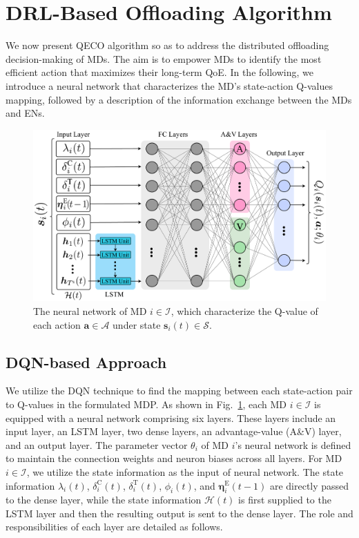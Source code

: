 \documentclass[10pt, journal,letterpaper]{IEEEtran}
\begin{document}
\section{DRL-Based Offloading Algorithm} \label{section:V}
We now present QECO algorithm so as to address the distributed offloading decision-making of MDs. The aim is to empower MDs to identify the most efficient action that maximizes their long-term QoE. In the following, we introduce a neural network that characterizes the MD's state-action Q-values mapping, followed by a description of the information exchange between the MDs and ENs.

\begin{figure}
	\centering
	\includegraphics[width=1\linewidth]{ DQN}
	\captionsetup{name=Fig.}
	\vspace*{-6mm}
	\caption{The neural network of MD $i \in \mathcal{I}$, which characterize the Q-value of each action $\boldsymbol{a} \in \mathcal{A}$ under state $\boldsymbol{s}_i(t) \in \mathcal{S}$.}
	\label{DQN}
\end{figure}


\subsection{DQN-based Approach}
We utilize the DQN technique to find the mapping between each state-action pair to Q-values in the formulated MDP. As shown in Fig.~\ref{DQN}, each MD $i \in \mathcal{I}$ is equipped with a neural network comprising six layers. These layers include an input layer, an LSTM layer, two dense layers, an advantage-value (A\&V) layer, and an output layer. The parameter vector $\theta_i$ of MD $i$'s neural network is defined to maintain the connection weights and neuron biases across all layers. For MD $i \in \mathcal{I}$, we utilize the state information as the input of neural network. The state information $\lambda_i(t)$, $\delta_i^{\text{C}}(t)$, $\delta_i^{\text{T}}(t)$, $\phi_i(t)$, and $\boldsymbol{\eta}_i^{\text{E}}(t-1)$ are directly passed to the dense layer, while the state information $\mathcal{H}(t)$ is first supplied to the LSTM layer and then the resulting output is sent to the dense layer. The role and responsibilities of each layer are detailed as follows.
\end{document}

